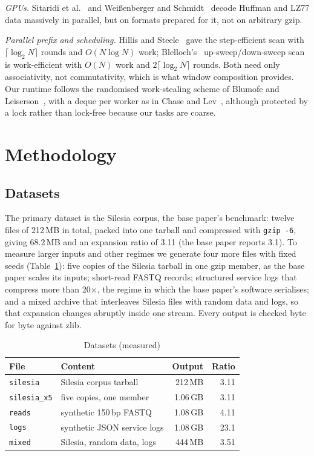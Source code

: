 \documentclass[conference]{IEEEtran}
\begin{document}
\emph{GPUs.} Sitaridi et al.~\cite{sitaridi} and Weißenberger and
Schmidt~\cite{weissenberger} decode Huffman and LZ77 data massively in parallel, but
on formats prepared for it, not on arbitrary gzip.

\emph{Parallel prefix and scheduling.} Hillis and Steele~\cite{hillis} gave the
step-efficient scan with $\lceil\log_2 N\rceil$ rounds and $O(N \log N)$ work;
Blelloch's~\cite{blelloch} up-sweep/down-sweep scan is work-efficient with $O(N)$
work and $2\lceil\log_2 N\rceil$ rounds. Both need only associativity, not
commutativity, which is what window composition provides. Our runtime follows the
randomised work-stealing scheme of Blumofe and Leiserson~\cite{blumofe}, with a deque
per worker as in Chase and Lev~\cite{chaselev}, although protected by a lock rather
than lock-free because our tasks are coarse.

\section{Methodology}

\subsection{Datasets}

The primary dataset is the Silesia corpus, the base paper's benchmark: twelve files
of 212\,MB in total, packed into one tarball and compressed with \texttt{gzip -6},
giving 68.2\,MB and an expansion ratio of 3.11 (the base paper reports 3.1). To
measure larger inputs and other regimes we generate four more files with fixed seeds
(Table~\ref{tab:data}): five copies of the Silesia tarball in one gzip member, as the
base paper scales its inputs; short-read FASTQ records; structured service logs that
compress more than 20$\times$, the regime in which the base paper's software
serialises; and a mixed archive that interleaves Silesia files with random data and
logs, so that expansion changes abruptly inside one stream. Every output is checked
byte for byte against zlib.

\begin{table}[t]
\caption{Datasets (measured)}
\label{tab:data}
\centering
\footnotesize
\setlength{\tabcolsep}{3pt}
\begin{tabular}{@{}llrr@{}}
\toprule
\textbf{File} & \textbf{Content} & \textbf{Output} & \textbf{Ratio} \\
\midrule
\texttt{silesia} & Silesia corpus tarball & 212\,MB & 3.11 \\
\texttt{silesia\_x5} & five copies, one member & 1.06\,GB & 3.11 \\
\texttt{reads} & synthetic 150\,bp FASTQ & 1.08\,GB & 4.11 \\
\texttt{logs} & synthetic JSON service logs & 1.08\,GB & 23.1 \\
\texttt{mixed} & Silesia, random data, logs & 444\,MB & 3.51 \\
\bottomrule
\end{tabular}
\end{table}
\end{document}
